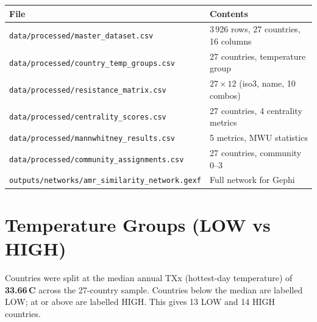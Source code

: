 \documentclass[12pt,a4paper]{article}
\begin{document}
\begin{tabular}{@{}ll@{}}
\toprule
File & Contents \\
\midrule
\texttt{data/processed/master\_dataset.csv} & 3\,926 rows, 27 countries, 16 columns \\
\texttt{data/processed/country\_temp\_groups.csv} & 27 countries, temperature group \\
\texttt{data/processed/resistance\_matrix.csv} & $27 \times 12$ (iso3, name, 10 combos) \\
\texttt{data/processed/centrality\_scores.csv} & 27 countries, 4 centrality metrics \\
\texttt{data/processed/mannwhitney\_results.csv} & 5 metrics, MWU statistics \\
\texttt{data/processed/community\_assignments.csv} & 27 countries, community 0--3 \\
\texttt{outputs/networks/amr\_similarity\_network.gexf} & Full network for Gephi \\
\bottomrule
\end{tabular}

\section{Temperature Groups (LOW vs HIGH)}

Countries were split at the median annual TXx (hottest-day temperature)
of \textbf{33.66\,\textdegree{}C} across the 27-country sample.
Countries below the median are labelled LOW; at or above are labelled HIGH.
This gives 13 LOW and 14 HIGH countries.
\end{document}
